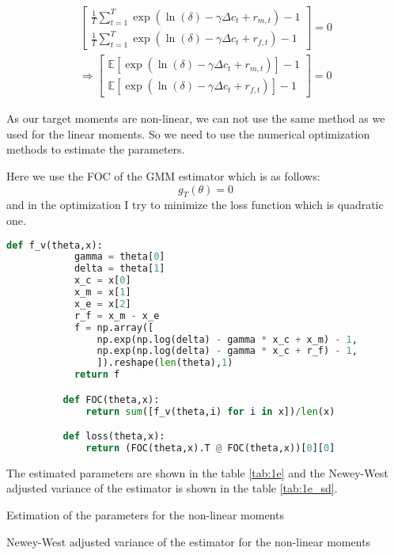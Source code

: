\begin{enumerate}[(a)]
\begin{gather*}
\begin{bmatrix}
            \frac{1}{T} \sum_{t=1}^T \exp(\ln(\delta) - \gamma\Delta c_t + r_{m,t})-1 \\
            \frac{1}{T} \sum_{t=1}^T \exp(\ln(\delta) - \gamma\Delta c_t + r_{f,t})-1
          \end{bmatrix} = 0\\
          \Rightarrow \begin{bmatrix}
            \mathbb{E} [\exp(\ln(\delta) - \gamma\Delta c_t + r_{m,t})]-1 \\
            \mathbb{E} [\exp(\ln(\delta) - \gamma\Delta c_t + r_{f,t})]-1
          \end{bmatrix} = 0
        \end{gather*}

        As our target moments are non-linear, we can not use the same method as we used for the linear moments. So we need to use the numerical optimization methods to estimate the parameters. 

        Here we use the FOC of the GMM estimator which is as follows:
        \begin{equation*}
          g_T(\theta) = 0
        \end{equation*}
        and in the optimization I try to minimize the loss function which is quadratic one.
        \begin{lstlisting}[language=Python, caption= Python code for defining the moments and the loss function for the non-linear moments, label={pcode:1e}, escapechar=|, frame=single, basicstyle=\small, showstringspaces=false, captionpos=b, breaklines=true, showspaces=false, showtabs=false, keywordstyle=\color{blue}, commentstyle=\color{gray}]
          def f_v(theta,x):
            gamma = theta[0]
            delta = theta[1]
            x_c = x[0]
            x_m = x[1]
            x_e = x[2]
            r_f = x_m - x_e
            f = np.array([
                np.exp(np.log(delta) - gamma * x_c + x_m) - 1,
                np.exp(np.log(delta) - gamma * x_c + r_f) - 1,
                ]).reshape(len(theta),1)
            return f

          def FOC(theta,x):
              return sum([f_v(theta,i) for i in x])/len(x)

          def loss(theta,x):
              return (FOC(theta,x).T @ FOC(theta,x))[0][0]
    \end{lstlisting}
    
    The estimated parameters are shown in the table \ref{tab:1e} and the Newey-West adjusted variance of the estimator is shown in the table \ref{tab:1e_sd}.
    \begin{table}[htbp!]
      \centering
      \caption{Estimation of the parameters for the non-linear moments}
      \label{tab:1e}
      
    \end{table}
    \begin{table}[htbp!]
      \centering
      \caption{Newey-West adjusted variance of the estimator for the non-linear moments}
      \label{tab:1e_sd}
      
    \end{table}
\end{enumerate}
